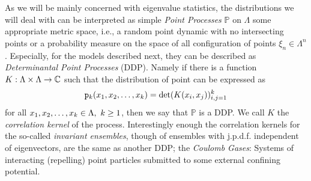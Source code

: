 As we will be mainly concerned with eigenvalue statistics, the distributions we will deal with can be interpreted as simple \textit{Point Processes} $\mathbb{P}$ on $\Lambda$ some appropriate metric space, i.e., a random point dynamic with no intersecting points or a probability measure on the space of all configuration of points $\xi_n \in \Lambda^n$. Especially, for the models described next, they can be described as \textit{Determinantal Point Processes} (DDP). Namely if there is a function $K: \Lambda \times \Lambda \rightarrow \mathbb{C}$ such that  the distribution of point can be expressed as
\begin{equation}
	\mathtt{p}_k(x_1, x_2, \dots, x_k) = \det(K(x_i, x_j))_{i,j = 1}^{k}
	\label{Equation: Determinantal}
\end{equation}
for all $x_1, x_2, \dots, x_k \in \Lambda, \ k \geq 1$, then we say that $\mathbb{P}$ is a DDP. We call $K$ the \textit{correlation kernel} of the process. Interestingly enough the correlation kernels for the so-called \textit{invariant ensembles}, though of ensembles with j.p.d.f. independent of eigenvectors, are the same as another DDP; the \textit{Coulomb Gases}: Systems of interacting (repelling) point particles submitted to some external confining potential. 

